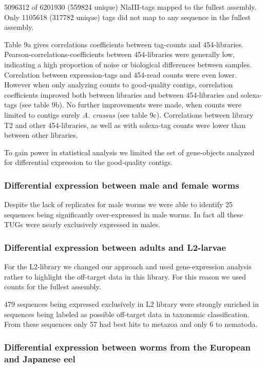 \documentclass[10pt]{bmc_article}
\newenvironment{bmcformat}{\begin{raggedright}\baselineskip20pt\sloppy\setboolean{publ}{false}}{\end{raggedright}\baselineskip20pt\sloppy}
\begin{document}
\begin{bmcformat}
5096312 of 6201930 (559824 unique) NlaIII-tags
mapped to the fullest assembly. Only 1105618
(317782 unique) tags did not map to any sequence in the
fullest assembly.

Table 9a gives correlations coefficients between tag-counts and
454-libraries. Pearson-correlations-coefficients between 454-libraries
were generally low, indicating a high proportion of noise or
biological differences between samples. Correlation between
expression-tags and 454-read counts were even lower. However when only
analyzing counts to good-quality contigs, correlation coefficients
improved both between libraries and between 454-libraries and
solexa-tags (see table 9b). No further improvements were made, when
counts were limited to contigs surely \textit{A. crassus} (see table
9c). Correlations between library T2 and other 454-libraries, as well
as with solexa-tag counts were lower than between other libraries.  

To gain power in statistical analysis we limited the set of
gene-objects analyzed for differential expression to the good-quality
contigs.

\subsubsection*{Differential expression between male and female worms}

Despite the lack of replicates for male worms we were able to identify
25 sequences being significantly
over-expressed in male worms. In fact all these TUGs were nearly
exclusively expressed in males. 

\subsubsection*{Differential expression between adults and L2-larvae}

For the L2-library we changed our approach and used gene-expression
analysis rather to highlight the off-target data in this library. For
this reason we used counts for the fullest assembly.

479 sequences being expressed exclusively
in L2 library were strongly enriched in sequences being labeled as
possible off-target data in taxonomic classification. From these
sequences only 57 had best hits to metazoa and only
6 to nematoda.

\subsubsection*{Differential expression between worms from the European
  and Japanese eel}


\end{bmcformat}
\end{document}
